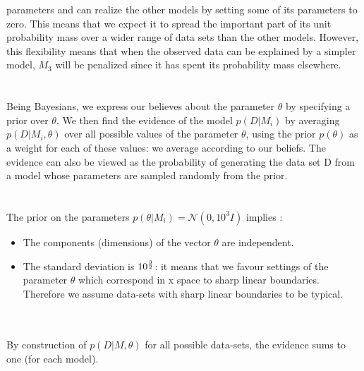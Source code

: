 \documentclass[a4paper,11pt]{article}
\theoremstyle{mytheor}
\begin{document}
parameters and can realize the other models by setting
some of its parameters to zero. This means that we expect
it to spread the important part of its unit probability mass over
a wider range of data sets than the other models. However, this flexibility means that when the observed data can be explained by a simpler model, $M_3$ will be penalized since it has spent its probability mass elsewhere.
\smallskip
\\\\
\smallskip
\\Being Bayesians, we express our believes about the parameter $\theta$ by specifying a prior over $\theta$. We then find the evidence of the model $p(D|M_i)$ by averaging $p(D|M_i, \theta)$ over all possible values of the parameter $\theta$, using the prior $p(\theta)$ as a weight for each of these values: we average according to our beliefs. The evidence can also be viewed as the probability
of generating the data set D from a model whose parameters are sampled randomly from the prior.
\smallskip
\\\\
\smallskip
\\The prior on the parameters $p(\theta | M_i) = \mathcal{N}(0, 10^3I)$ implies :
\begin{itemize}
\item The components (dimensions) of the vector $\theta$ are independent.
\item The standard deviation is $10^{3\over2}$: it means that we favour settings of the parameter $\theta$ which correspond in x space to sharp linear boundaries. Therefore we assume data-sets with sharp linear boundaries to be typical. 
\end{itemize}
\hfill \\
\smallskip
\\By construction of $p(D|M,\theta)$ for all possible data-sets, the evidence sums to one (for each model). 
\smallskip
\\\\
\end{document}

